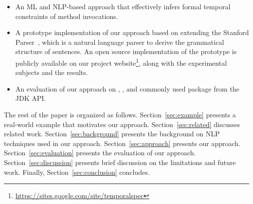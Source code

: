 \begin{itemize}
	\item An ML and NLP-based approach that effectively infers formal temporal constraints of method invocations. 
	\item A prototype implementation of our approach based on extending the Stanford Parser~\cite{Klein03}, which is a natural language parser to derive the grammatical structure of sentences.
	An open source implementation of the prototype is publicly available on our project website\footnote{\url{https://sites.google.com/site/temporalspec}}, along with the experimental subjects and the results. 
	\item An evaluation of our approach on \amazonAPI, \paypalAPI, and commonly used package  from the JDK API. 
\end{itemize}


The rest of the paper is organized as follows.
Section~\ref{sec:example} presents a real-world example that motivates our approach.
Section~\ref{sec:related} discusses related work.
Section~\ref{sec:background} presents the  background on NLP techniques used in our approach.
Section~\ref{sec:approach} presents our approach.
Section~\ref{sec:evaluation} presents the evaluation of our approach.
Section~\ref{sec:discussion} presents brief discussion on the limitations and future work.
Finally, Section~\ref{sec:conclusion} concludes.

